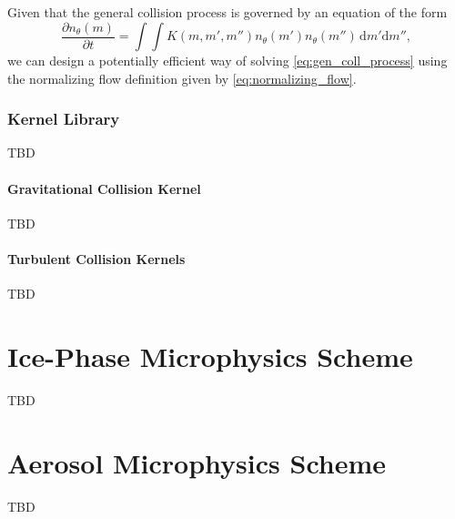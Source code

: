 \documentclass{report}
\begin{document}
Given that the general collision process is governed by an equation of the form
\begin{equation}
    \label{eq:gen_coll_process}
    \frac{\partial n_\theta(m)}{\partial t} = \int \int K(m, m',m'')n_\theta(m')n_\theta(m'')\, \mathrm{d}m'\mathrm{d}m'',
\end{equation}
we can design a potentially efficient way of solving \eqref{eq:gen_coll_process} using the normalizing flow definition given by \eqref{eq:normalizing_flow}.

\subsection{Kernel Library}
TBD

\subsubsection{Gravitational Collision Kernel}
TBD

\subsubsection{Turbulent Collision Kernels}
TBD

\chapter{Ice-Phase Microphysics Scheme}
TBD

\chapter{Aerosol Microphysics Scheme}
TBD




\end{document}
